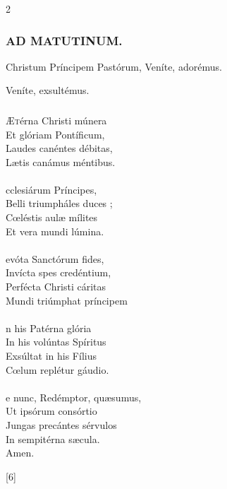 \documentclass[9pt,twoside]{extarticle}
\begin{document}
\begin{multicols}{2}
{\subsubsection*{\center \textsc{AD MATUTINUM.}}
\begin{tightlist}{}
\item {} Christum Príncipem Pastórum, \textred{*} Veníte, adorémus.
\item {} Veníte, exsultémus.
\end{tightlist}

\subsubsection*{\center {}}
\lettrine{Æ}térna Christi múnera\\
Et glóriam Pontíficum,\\
Laudes canéntes débitas,\\
Lætis canámus méntibus.\\
\\
cclesiárum Príncipes,\\
Belli triumpháles duces ;\\
Cœléstis aulæ mílites\\
Et vera mundi lúmina.\\
\\
evóta Sanctórum fides,\\
Invícta spes credéntium,\\
Perfécta Christi cáritas\\
Mundi triúmphat príncipem\\
\\
n his Patérna glória\\
In his volúntas Spíritus\\
Exsúltat in his Fílius\\
Cœlum replétur gáudio.\\
\\
e nunc, Redémptor, quæsumus,\\
Ut ipsórum consórtio\\
Jungas precántes sérvulos\\
In sempitérna sæcula.\\
Amen.

\begin{tightlist}{}
\item {} [6]
\end{tightlist}

}
\end{multicols}
\end{document}
